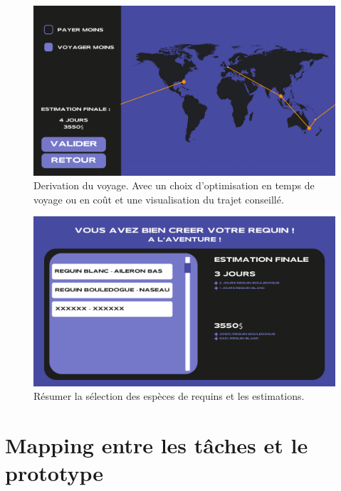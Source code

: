 \documentclass{article}
\begin{document}
\begin{figure}[!h]
	\centering
	\includegraphics[width=14.4cm]{assets/prototype/basse/onglet5}
	\caption{Derivation du voyage. Avec un choix d'optimisation en temps de voyage ou en coût et une visualisation du trajet conseillé.}
	\label{onglet5}
\end{figure}

\begin{figure}[!h]
	\centering
	\includegraphics[width=14.4cm]{assets/prototype/basse/onglet6}
	\caption{Résumer la sélection des espèces de requins et les estimations.}
	\label{onglet6}
\end{figure}

\section{Mapping entre les tâches et le prototype}
\end{document}
